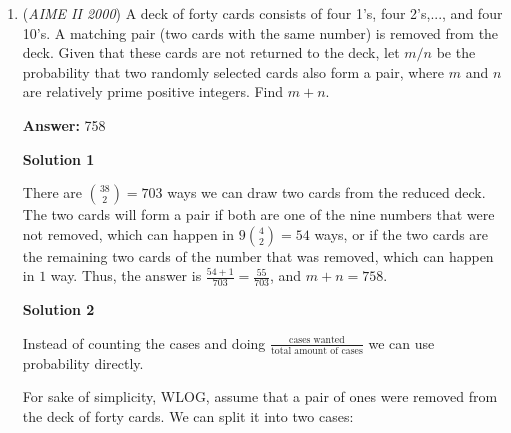 \begin{enumerate}
\textbf{Solution 3}

If we restrict ourselves to the first quadrant, this is equivalent to finding \href{https://artofproblemsolving.com/wiki/index.php?title=Pythagorean\_triple}{Pythagorean triples} for $2000^2 + y^2 = x^2$. We know that every Pythagorean triple corresponds to a pair of integers $m$ and $n$ giving:

 
 \begin{align*} y = m^2 - n^2, && b = 2mn, && x = m^2 + n^2 \end{align*}


 If we let $b=2mn=2000$ then each Pythagorean triple corresponds to a factorization $mn = 1000 = 2^35^3$, of which there are $4\times4=25$.

 But we've been only looking at the first quadrant. If we reflect this quadrant to the others, and eliminate the two duplicate reflections where $y=0$, we end up with $25\times4-2 = 098$ solutions.

 


	\item (\textit{AIME II 2000}) A deck of forty cards consists of four 1's, four 2's,..., and four 10's.  A matching pair (two cards with the same number) is removed from the deck.  Given that these cards are not returned to the deck, let $m/n$ be the probability that two randomly selected cards also form a pair, where $m$ and $n$ are relatively prime positive integers.  Find $m + n.$

 \textbf{Answer: }758



\textbf{Solution 1}

There are ${38 \choose 2} = 703$ ways we can draw two cards from the reduced deck. The two cards will form a pair if both are one of the nine numbers that were not removed, which can happen in $9{4 \choose 2} = 54$ ways, or if the two cards are the remaining two cards of the number that was removed, which can happen in $1$ way. Thus, the answer is $\frac{54+1}{703} = \frac{55}{703}$, and $m+n = \boxed{758}$.

 



\textbf{Solution 2}

Instead of counting the cases and doing $\frac{\text{cases wanted}}{\text{total amount of cases}}$ we can use probability directly.

 
For sake of simplicity, WLOG, assume that a pair of ones were removed from the deck of forty cards. We can split it into two cases:


\end{enumerate}
